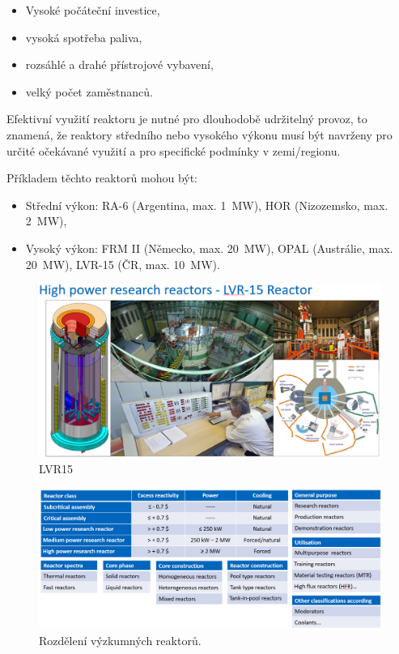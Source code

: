 \begin{itemize}
    \item Vysoké počáteční investice,
    \item vysoká spotřeba paliva,
    \item rozsáhlé a drahé přístrojové vybavení,
    \item velký počet zaměstnanců.
\end{itemize}

Efektivní využití reaktoru je nutné pro dlouhodobě udržitelný provoz, to znamená, že reaktory středního nebo vysokého výkonu musí být navrženy pro určité očekávané využití a pro specifické podmínky v zemi/regionu.

Příkladem těchto reaktorů mohou být:

\begin{itemize}
    \item Střední výkon: RA-6 (Argentina, max. 1~MW), HOR (Nizozemsko, max. 2~MW),
    \item Vysoký výkon: FRM II (Německo, max. 20~MW), OPAL (Austrálie, max. 20~MW), LVR-15 (ČR, max. 10~MW).
\end{itemize}

\begin{figure}[H]
    \centering
    \includegraphics[width=0.75\linewidth]{img/LVR15.png}
    \caption{LVR15}
    \label{fig:enter-label}
\end{figure}

\begin{figure}[H]
    \centering
    \includegraphics[width=0.75\linewidth]{img/RozděleníRR.png}
    \caption{Rozdělení výzkumných reaktorů.}
    \label{fig:enter-label}
\end{figure}

